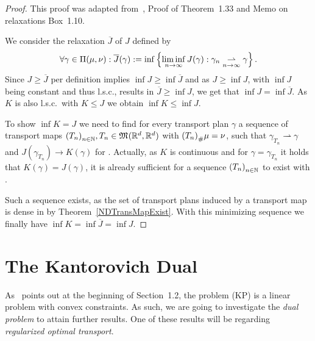 \begin{proof}
	This proof was adapted from~\cite{San2015}, Proof of Theorem~1.33 and Memo on relaxations Box~1.10.

	We consider the relaxation $\overline{J}$ of $J$ defined by
	\[ \forall \gamma \in \TP{\mu}{\nu}: \overline{J}(\gamma) := \inf \left\{ \liminf\limits_{\Ninf} J(\gamma) : \weak{\gamma_n}{\gamma} \right\}. \]
	Since $J \ge \overline{J}$ per definition implies $\inf J \ge \inf \overline{J}$ and as $J \ge \inf J$, with $\inf J$ being constant and thus l.s.c., results in $\overline{J} \ge \inf J$, we get that $\inf J = \inf \overline{J}$. As $K$ is also l.s.c.\ with $K \le J$ we obtain $\inf K \le \inf J$.

	To show $\inf K = J$ we need to find for every transport plan $\gamma$ a sequence of transport maps ${(T_n)}_{\NinN}, T_n \in \MF{\R^d}{\R^d}$ with $\push[(T_n)]{\mu} = \nu$, such that $\gamma_{T_n} \rightharpoonup \gamma$ and $J(\gamma_{T_n}) \rightarrow K(\gamma)$ for \Ninf. Actually, as $K$ is continuous and for $\gamma = \gamma_{T_n}$ it holds that $K(\gamma) = J(\gamma)$, it is already sufficient for a sequence ${(T_n)}_{\NinN}$ to exist with .

	Such a sequence exists, as the set of transport plans induced by a transport map is dense in \TP{\mu}{\nu} by Theorem~\ref{NDTransMapExist}. With this minimizing sequence we finally have $\inf K = \inf \overline{J} = \inf J$.
\end{proof}

\section{The Kantorovich Dual}\label{KanDual}

As~\cite{San2015} points out at the beginning of Section~1.2, the problem (KP) is a linear problem with convex constraints. As such, we are going to investigate the \textit{dual problem} to attain further results. One of these results will be regarding \textit{regularized optimal transport}.


